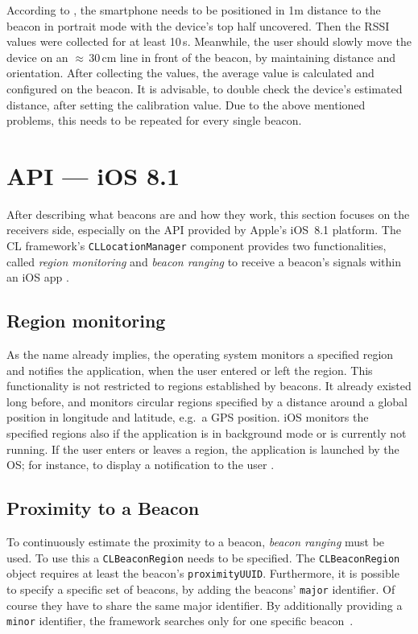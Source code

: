 According to \citet{apple:getting_started}, the smartphone needs to be positioned in 1m distance to the beacon in portrait mode with the device's top half uncovered. Then the \ac{RSSI} values were collected for at least 10\,s. Meanwhile, the user should slowly move the device on an $\approx$\,30\,cm line in front of the beacon, by maintaining distance and orientation. After collecting the values, the average value is calculated and configured on the beacon. It is advisable, to double check the device's estimated distance, after setting the calibration value. Due to the above mentioned problems, this needs to be repeated for every single beacon.

\section{API --- iOS 8.1}
After describing what beacons are and how they work, this section focuses on the receivers side, especially on the \acs{API} provided by Apple's iOS~8.1 platform. The \acf{CL} framework's \texttt{CLLocationManager} component provides two functionalities, called \emph{region monitoring} and \emph{beacon ranging} to receive a beacon's signals within an iOS app \citep{apple:ios_doc_cl}.

\subsection*{Region monitoring}
As the name already implies, the operating system monitors a specified region and notifies the application, when the user entered or left the region. This functionality is not restricted to regions established by beacons. It already existed long before, and monitors circular regions specified by a distance around a global position in longitude and latitude, e.g.\ a \acs{GPS} position.
iOS monitors the specified regions also if the application is in background mode or is currently not running. If the user enters or leaves a region, the application is launched by the \ac{OS}; for instance, to display a notification to the user \citep{apple:wwdc_2012_bruins,apple:wwdc_2013_bruins,apple:ios_doc_cl}.

\subsection*{Proximity to a Beacon}
To continuously estimate the proximity to a beacon, \emph{beacon ranging} must be used. To use this a \texttt{CLBeaconRegion} needs to be specified. The \texttt{CLBeaconRegion} object requires at least the beacon's \texttt{proximityUUID}. Furthermore, it is possible to specify a specific set of beacons, by adding the beacons' \texttt{major} identifier. Of course they have to share the same major identifier. By additionally providing a \texttt{minor} identifier, the framework searches only for one specific beacon~\citep{apple:wwdc_2013_bruins,apple:ios_doc_cl}.

